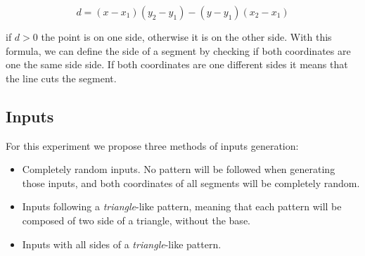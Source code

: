 \documentclass[letterpaper]{article}
\begin{document}
$$
d = (x - x_1)(y_2 - y_1) - (y - y_1)(x_2 - x_1)
$$


if $d > 0$ the point is on one side, otherwise it is on the other side.
With this formula, we can define the side of a segment by checking if both
coordinates are one the same side side. If both coordinates are one different sides it means
that the line cuts the segment.


\subsection{Inputs}

For this experiment we propose three methods of inputs generation:

\begin{itemize}
  \item Completely random inputs. No pattern will be followed when generating those inputs,
  and both coordinates of all segments will be completely random.
  \item Inputs following a \textit{triangle}-like pattern, meaning that each pattern
  will be composed of two side of a triangle, without the base.
  \item Inputs with all sides of a \textit{triangle}-like pattern.
\end{itemize}
\end{document}
